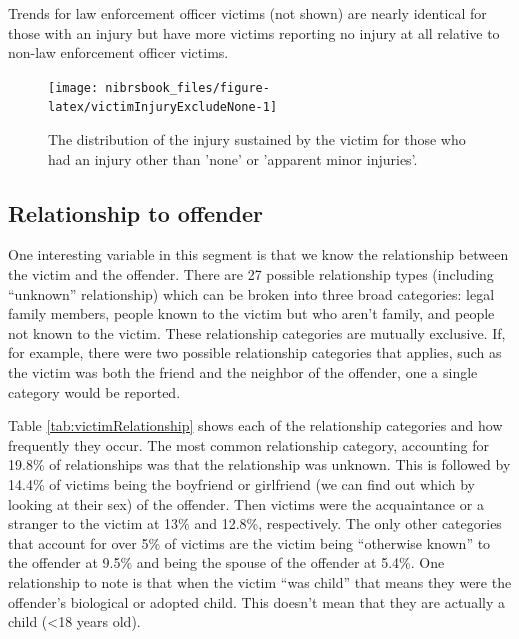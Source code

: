 \documentclass[
  12pt,
  openany]{book}
\begin{document}
Trends for law enforcement officer victims (not shown) are nearly identical for those with an injury but have more victims reporting no injury at all relative to non-law enforcement officer victims.

\begin{figure}

{\centering \texttt{[image: nibrsbook\_files/figure-latex/victimInjuryExcludeNone-1]} 

}

\caption{The distribution of the injury sustained by the victim for those who had an injury other than 'none' or 'apparent minor injuries'.}\label{fig:victimInjuryExcludeNone}
\end{figure}

\hypertarget{relationship-to-offender}{%
\subsection{Relationship to offender}\label{relationship-to-offender}}

One interesting variable in this segment is that we know the relationship between the victim and the offender. There are 27 possible relationship types (including ``unknown'' relationship) which can be broken into three broad categories: legal family members, people known to the victim but who aren't family, and people not known to the victim. These relationship categories are mutually exclusive. If, for example, there were two possible relationship categories that applies, such as the victim was both the friend and the neighbor of the offender, one a single category would be reported.

Table \ref{tab:victimRelationship} shows each of the relationship categories and how frequently they occur. The most common relationship category, accounting for 19.8\% of relationships was that the relationship was unknown. This is followed by 14.4\% of victims being the boyfriend or girlfriend (we can find out which by looking at their sex) of the offender. Then victims were the acquaintance or a stranger to the victim at 13\% and 12.8\%, respectively. The only other categories that account for over 5\% of victims are the victim being ``otherwise known'' to the offender at 9.5\% and being the spouse of the offender at 5.4\%. One relationship to note is that when the victim ``was child'' that means they were the offender's biological or adopted child. This doesn't mean that they are actually a child (\textless18 years old).
\end{document}
